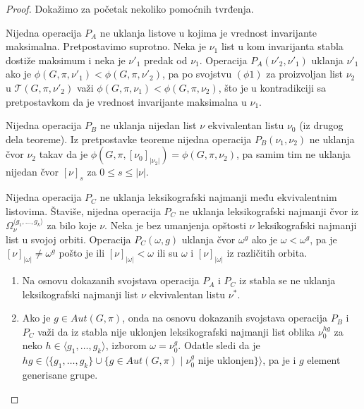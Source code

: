 \documentclass[12pt,oneside]{memoir}
\theoremstyle{definition}
\begin{document}
  \begin{proof}
	  Dokažimo za početak nekoliko pomoćnih tvrđenja.

	  Nijedna operacija $P_A$ ne uklanja listove u kojima je vrednost
	  invarijante maksimalna. Pretpostavimo suprotno. Neka je $\nu_1$ list u
	  kom invarijanta stabla dostiže maksimum i neka je $\nu'_1$ predak od
	  $\nu_1$. Operacija $P_A(\nu'_2, \nu'_1)$ uklanja $\nu'_1$ ako je $\phi(G,
	  \pi, \nu'_1) < \phi(G, \pi, \nu'_2)$, pa po svojstvu $(\phi1)$ za
	  proizvoljan list $\nu_2$ u $\mathcal{T}(G, \pi, \nu'_2)$ važi $\phi(G,
	  \pi, \nu_1) < \phi(G, \pi, \nu_2)$, što je u kontradikciji sa
	  pretpostavkom da je vrednost invarijante maksimalna u $\nu_1$.

	  Nijedna operacija $P_B$ ne uklanja nijedan list $\nu$ ekvivalentan listu
	  $\nu_0$ (iz drugog dela teoreme). Iz pretpostavke teoreme nijedna
	  operacija $P_B(\nu_1, \nu_2)$ ne uklanja čvor $\nu_2$ takav da je
	  $\phi(G, \pi, [\nu_0]_{|\nu_2|}) = \phi(G, \pi, \nu_2)$, pa samim tim ne
	  uklanja nijedan čvor $[\nu]_{s}$ za $0 \leq s \leq |\nu|$.

	  Nijedna operacija $P_C$ ne uklanja leksikografski najmanji među
	  ekvivalentnim listovima. Štaviše, nijedna operacija $P_C$ ne uklanja
	  leksikografski najmanji čvor iz $\Omega_\nu^{\langle g_1, \dots, g_k
	  \rangle}$ za bilo koje $\nu$. Neka je bez umanjenja opštosti $\nu$
	  leksikografski najmanji list u svojoj orbiti. Operacija $P_C(\omega, g)$
	  uklanja čvor $\omega^g$ ako je $\omega < \omega^g$, pa je
	  $[\nu]_{|\omega|} \neq \omega^g$ pošto je ili $[\nu]_{|\omega|} < \omega$
	  ili su $\omega$ i $[\nu]_{|\omega|}$ iz različitih orbita.
	  \begin{enumerate}
		  \item Na osnovu dokazanih svojstava operacija $P_A$ i $P_C$ iz stabla
			  se ne uklanja leksikografski najmanji list $\nu$ ekvivalentan
			  listu $\nu^*$.
		  \item Ako je $g \in Aut(G, \pi)$, onda na osnovu dokazanih svojstava
			  operacija $P_B$ i $P_C$ važi da iz stabla nije uklonjen
			  leksikografski najmanji list oblika $\nu_0^{hg}$ za neko $h \in \langle
			  g_1, \dots, g_k \rangle$, izborom $\omega =
			  \nu_0^g$. Odatle sledi da je $hg \in \langle \{g_1, \dots,
			  g_k\} \cup \{g \in Aut(G, \pi) \mid \nu_0^g \text{ nije
			  uklonjen}\} \rangle$, pa je i $g$ element generisane
			  grupe.
	  \end{enumerate}
  \end{proof}
\end{document}
